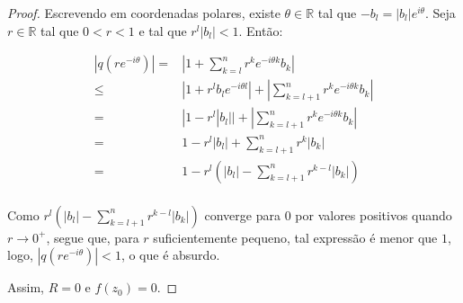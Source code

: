 \begin{proof}
    Escrevendo em coordenadas polares, existe $\theta\in \mathbb R$ tal que $-b_l=|b_l|e^{i\theta}$. Seja $r \in \mathbb R$ tal que $0<r<1$ e tal que $r^l|b_l|<1$. Então:

    \begin{align*}
        |q(re^{-i\theta})|=&\left|1+\sum_{k=l}^n r^k e^{-i\theta k}b_k\right|\\
        \leq& |1+r^lb_le^{-i\theta l}|+ \left|\sum_{k=l+1}^n r^k e^{-i\theta k}b_k\right|\\
        =& |1-r^l |b_l||+\left|\sum_{k=l+1}^n r^k e^{-i\theta k}b_k\right|\\
        =& 1-r^l |b_l|+ \sum_{k=l+1}^n r^k |b_k|\\
        =& 1-r^l\left(|b_l|- \sum_{k=l+1}^n r^{k-l} |b_k|\right)\\
    \end{align*}

    Como $r^l\left(|b_l|- \sum_{k=l+1}^n r^{k-l} |b_k|\right)$ converge para $0$ por valores positivos quando $r\to 0^+$, segue que, para $r$ suficientemente pequeno, tal expressão é menor que $1$, logo, $|q(re^{-i\theta})|<1$, o que é absurdo.

    Assim, $R=0$ e $f(z_0)=0$.    
\end{proof}
